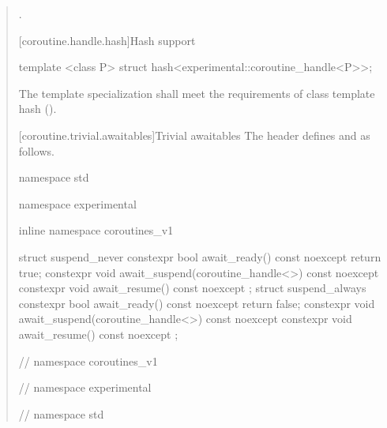 \begin{quote}
\begin{itemdescr}
  \pnum
  \returns {}.
\end{itemdescr}

[coroutine.handle.hash]{Hash support}

\begin{itemdecl}
  template <class P> struct hash<experimental::coroutine_handle<P>>;
\end{itemdecl}

\begin{itemdescr}
  \pnum
The template specialization shall meet the requirements of class template hash ().
\end{itemdescr}

[coroutine.trivial.awaitables]{Trivial awaitables}
The header  defines  and  as follows.
\begin{codeblock}
namespace std {
namespace experimental {
inline namespace coroutines_v1 {

  struct suspend_never {
    constexpr bool await_ready() const noexcept { return true; }
    constexpr void await_suspend(coroutine_handle<>) const noexcept {}
    constexpr void await_resume() const noexcept {}
  };
  struct suspend_always {
    constexpr bool await_ready() const noexcept { return false; }
    constexpr void await_suspend(coroutine_handle<>) const noexcept {}
    constexpr void await_resume() const noexcept {}
  };

} // namespace coroutines_v1
} // namespace experimental
} // namespace std
\end{codeblock}
\end{quote}

